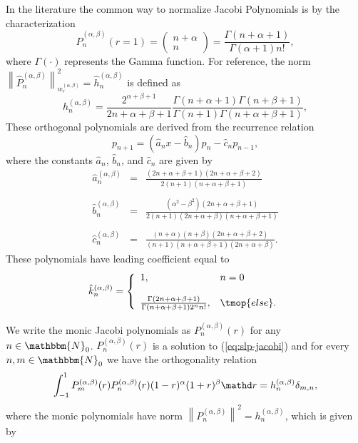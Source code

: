 In the literature the common way to normalize Jacobi Polynomials is by the
characterization
\[ \hat{P}_n^{(\alpha, \beta)} (r = 1) = \left( \begin{array}{c}
     n + \alpha\\
     n
   \end{array} \right) = \frac{\Gamma (n + \alpha + 1)}{\Gamma (\alpha + 1)
   n!}, \]
where $\Gamma \left( \cdot \right)$ represents the Gamma function. For
reference, the norm $\left\| \hat{P}_n^{(\alpha, \beta)}
\right\|_{w_r^{(\alpha, \beta)}}^2 = \hat{h}_n^{(\alpha, \beta)}$ is defined
as
\[ h_n^{(\alpha, \beta)} = \frac{2^{\alpha + \beta + 1}}{2 n + \alpha + \beta
   + 1}  \frac{\Gamma (n + \alpha + 1) \Gamma (n + \beta + 1)}{\Gamma (n + 1)
   \Gamma (n + \alpha + \beta + 1)}, \]
These orthogonal polynomials are derived from the recurrence relation
\[ p_{n + 1} = ( \hat{a}_n x - \hat{b}_n) p_n - \hat{c}_n p_{n - 1}, \]
where the constants $\hat{a}_n$, $\hat{b}_n$, and $\hat{c}_n$ are given by
\[ \begin{array}{lll}
     \hat{a}^{(\alpha, \beta)}_n & = & \frac{(2 n + \alpha + \beta + 1) (2 n +
     \alpha + \beta + 2)}{2 (n + 1) (n + \alpha + \beta + 1)}\\
     &  & \\
     \hat{b}^{(\alpha, \beta)}_n & = & \frac{(\alpha^2 - \beta^2) (2 n +
     \alpha + \beta + 1)}{2 (n + 1) (2 n + \alpha + \beta) (n + \alpha + \beta
     + 1)}\\
     &  & \\
     \hat{c}^{(\alpha, \beta)}_n & = & \frac{(n + \alpha) (n + \beta) (2 n +
     \alpha + \beta + 2)}{(n + 1) (n + \alpha + \beta + 1) (2 n + \alpha +
     \beta)} .
   \end{array} \]
These polynomials have leading coefficient equal to
\[ \hat{k}_n^{(\alpha, \beta)} = \left\{ \begin{array}{ll}
     1, & n = 0\\
     & \\
     \frac{\Gamma (2 n + \alpha + \beta + 1)}{\Gamma (n + \alpha + \beta + 1)
     2^n n!}, & \tmop{else} .
   \end{array} \right. \]


We write the monic Jacobi polynomials as $P^{(\alpha, \beta)}_n (r)$ for any
$n \in \mathbbm{N}_0$. $P^{(\alpha, \beta)}_n (r)$
is a solution to (\ref{eq:slp-jacobi}) and for every $n, m \in \mathbbm{N}_0$
we have the orthogonality relation
\[ \int_{- 1}^1 P_m^{(\alpha, \beta)} (r) P_n^{(\alpha, \beta)} (r) (1 -
   r)^{\alpha} (1 + r)^{\beta} \mathd r = h_n^{(\alpha, \beta)} \delta_{m, n},
\]
where the monic polynomials have norm $\left\| P_n^{(\alpha, \beta)}
\right\|_{}^2 = h_n^{(\alpha, \beta)}$, which is given by


